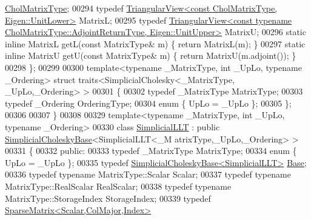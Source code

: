 \begin{DoxyCode}
         \hyperlink{group___sparse_core___module}{CholMatrixType};
00294   \textcolor{keyword}{typedef} \hyperlink{group___core___module_class_eigen_1_1_triangular_view}{TriangularView<const CholMatrixType, Eigen::UnitLower>}
        MatrixL;
00295   \textcolor{keyword}{typedef} 
      \hyperlink{group___core___module_class_eigen_1_1_triangular_view}{TriangularView<const typename CholMatrixType::AdjointReturnType, Eigen::UnitUpper>}
       MatrixU;
00296   \textcolor{keyword}{static} \textcolor{keyword}{inline} MatrixL getL(\textcolor{keyword}{const} MatrixType& m) \{ \textcolor{keywordflow}{return} MatrixL(m); \}
00297   \textcolor{keyword}{static} \textcolor{keyword}{inline} MatrixU getU(\textcolor{keyword}{const} MatrixType& m) \{ \textcolor{keywordflow}{return} MatrixU(m.adjoint()); \}
00298 \};
00299 
00300 \textcolor{keyword}{template}<\textcolor{keyword}{typename} \_MatrixType, \textcolor{keywordtype}{int} \_UpLo, \textcolor{keyword}{typename} \_Ordering> \textcolor{keyword}{struct }traits<SimplicialCholesky<\_MatrixType,
      \_UpLo,\_Ordering> >
00301 \{
00302   \textcolor{keyword}{typedef} \_MatrixType MatrixType;
00303   \textcolor{keyword}{typedef} \_Ordering OrderingType;
00304   \textcolor{keyword}{enum} \{ UpLo = \_UpLo \};
00305 \};
00306 
00307 \}
00308 
00329 \textcolor{keyword}{template}<\textcolor{keyword}{typename} \_MatrixType, \textcolor{keywordtype}{int} \_UpLo, \textcolor{keyword}{typename} \_Ordering>
00330     \textcolor{keyword}{class }\hyperlink{group___sparse_cholesky___module_class_eigen_1_1_simplicial_l_l_t}{SimplicialLLT} : \textcolor{keyword}{public} \hyperlink{group___sparse_cholesky___module_class_eigen_1_1_simplicial_cholesky_base}{SimplicialCholeskyBase}<SimplicialLLT<\_M
      atrixType,\_UpLo,\_Ordering> >
00331 \{
00332 \textcolor{keyword}{public}:
00333     \textcolor{keyword}{typedef} \_MatrixType MatrixType;
00334     \textcolor{keyword}{enum} \{ UpLo = \_UpLo \};
00335     \textcolor{keyword}{typedef} \hyperlink{group___sparse_cholesky___module_class_eigen_1_1_simplicial_cholesky_base}{SimplicialCholeskyBase<SimplicialLLT>} 
      \hyperlink{group___sparse_core___module}{Base};
00336     \textcolor{keyword}{typedef} \textcolor{keyword}{typename} MatrixType::Scalar Scalar;
00337     \textcolor{keyword}{typedef} \textcolor{keyword}{typename} MatrixType::RealScalar RealScalar;
00338     \textcolor{keyword}{typedef} \textcolor{keyword}{typename} MatrixType::StorageIndex StorageIndex;
00339     \textcolor{keyword}{typedef} \hyperlink{group___sparse_core___module_class_eigen_1_1_sparse_matrix}{SparseMatrix<Scalar,ColMajor,Index>} 

\end{DoxyCode}
